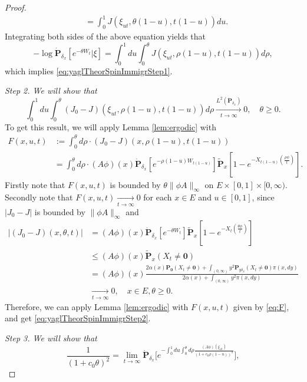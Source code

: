 \documentclass[UTF8]{pkuthss}
\theoremstyle{plain}
\theoremstyle{definition}
\numberwithin{equation}{section}
\begin{document}
\begin{proof}
\[\begin{split}
	&=\int_0^1 J(\xi_{ut},\theta(1-u),t(1-u)) du.
\end{split}\]
	Integrating both sides of the above equation yields that
\[
	-\log \dot{\mathbf P}_{\delta_x}[e^{-\theta W_t}|\xi]
	=\int_0^1 du\int_0^\theta J(\xi_{ut},\rho(1-u),t(1-u)) d\rho,
\]
	which implies \eqref{eq:yaglTheorSpinImmigrStep1}.
\par
	\emph{Step 2. We will show that}
\begin{equation}\label{eq:yaglTheorSpinImmigrStep2}
	\int_0^1 du\int_0^\theta (J_0-J)(\xi_{ut},\rho(1-u),t(1-u)) d\rho
	\xrightarrow[t\to\infty]{L^2(\dot{\mathbf P}_{\delta_x})} 0,\quad \theta\geq 0.
\end{equation}
	To get this result, we will apply Lemma \ref{lem:ergodic} with
\begin{equation}\label{eq:F}\begin{split}
	F(x,u,t)
	&:=\int_0^\theta d\rho\cdot (J_0-J)(x,\rho(1-u),t(1-u))\\
	&=\int_0^\theta d\rho\cdot  (A\phi)(x)\dot{\mathbf P}_{\delta_{x}}[e^{-\rho(1-u)W_{t(1-u)}}]\widetilde{\mathbf P}_{x}[1-e^{-X_{t(1-u)}(\frac{\rho\phi}{t})}].
\end{split}\end{equation}
	Firstly note that $F(x,u,t)$ is bounded by $\theta\|\phi A\|_\infty$ on $E\times[0,1]\times[0,\infty)$.
	Secondly note that $F(x,u,t)\xrightarrow[t\to\infty]{} 0$ for each $x\in E$ and $u\in[0,1]$, since $|J_0-J|$ is bounded by $\|\phi A\|_\infty$ and
\[\begin{split}
	\big|(J_0-J)(x,\theta,t)\big|
	&=  (A\phi)(x)\dot{\mathbf P}_{\delta_{x}}[e^{-\theta W_{t}}]\widetilde{\mathbf P}_{x}[1-e^{-X_t(\frac{\theta\phi}{t})}]\\
	&\leq  (A\phi)(x)\widetilde{\mathbf P}_{x}(X_t\neq \mathbf 0) \\
	&=  (A\phi)(x)\frac{2\alpha(x)\mathbf P_{\mathbf 0}(X_t\neq \mathbf 0)+\int_{(0,\infty)}y^2\mathbf P_{y\delta_x}(X_t\neq \mathbf 0)\pi(x,dy)}{2\alpha(x)+\int_{(0,\infty)}y^2\pi(x,dy)}\\
	&\xrightarrow[t\to\infty]{} 0, \quad x\in E,\theta\geq 0.
\end{split}\]
	Therefore, we can apply Lemma \ref{lem:ergodic} with $F(x,u,t)$ given by \eqref{eq:F}, and get \eqref{eq:yaglTheorSpinImmigrStep2}.
\par
	\emph{Step 3. We will show that}
\begin{equation}\label{eq:yaglTheorSpinImmigrStep3}
	\frac{1}{(1+c_0\theta)^2}
	= \lim_{t\to\infty} \dot {\mathbf P}_{\delta_x} \Big[e^{- \int_0^1 du \int_0^\theta d\rho \frac{ (A\phi)(\xi_{ut})}{(1+c_0\rho(1-u))^2} }\Big],

\end{equation}
\end{proof}
\end{document}
